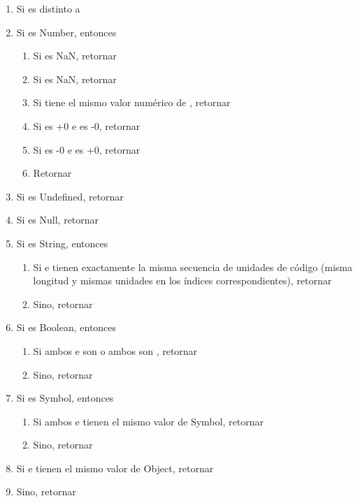 \begin{enumerate}
\item Si  es distinto a 
\item Si  es Number, entonces
\begin{enumerate}
\item Si  es NaN, retornar 
\item Si  es NaN, retornar 
\item Si  tiene el mismo valor numérico de , retornar 
\item Si  es +0 e  es -0, retornar 
\item Si  es -0 e  es +0, retornar 
\item Retornar 
\end{enumerate}
\item Si  es Undefined, retornar 
\item Si  es Null, retornar 
\item Si  es String, entonces
\begin{enumerate}
\item Si  e  tienen exactamente la misma secuencia de unidades de código (misma longitud y mismas unidades en los índices correspondientes), retornar 
\item Sino, retornar 
\end{enumerate}
\item Si  es Boolean, entonces
\begin{enumerate}
\item Si ambos  e  son  o ambos son , retornar 
\item Sino, retornar 
\end{enumerate}
\item Si  es Symbol, entonces
\begin{enumerate}
\item Si ambos  e  tienen el mismo valor de Symbol, retornar 
\item Sino, retornar 
\end{enumerate}
\item Si  e  tienen el mismo valor de Object, retornar 
\item Sino, retornar 
\end{enumerate}

